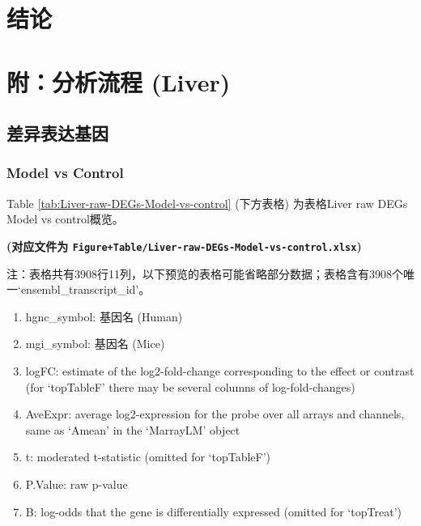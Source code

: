 \documentclass[
]{article}
\providecommand{\tightlist}{%
  \setlength{\itemsep}{0pt}\setlength{\parskip}{0pt}}
\begin{document}
\hypertarget{dis}{%
\section{结论}\label{dis}}

\hypertarget{workflow}{%
\section{附：分析流程 (Liver)}\label{workflow}}

\hypertarget{ux5deeux5f02ux8868ux8fbeux57faux56e0}{%
\subsection{差异表达基因}\label{ux5deeux5f02ux8868ux8fbeux57faux56e0}}

\hypertarget{model-vs-control}{%
\subsubsection{Model vs Control}\label{model-vs-control}}

Table \ref{tab:Liver-raw-DEGs-Model-vs-control} (下方表格) 为表格Liver raw DEGs Model vs control概览。

\textbf{(对应文件为 \texttt{Figure+Table/Liver-raw-DEGs-Model-vs-control.xlsx})}

\begin{center}\begin{tcolorbox}[colback=gray!10, colframe=gray!50, width=0.9\linewidth, arc=1mm, boxrule=0.5pt]注：表格共有3908行11列，以下预览的表格可能省略部分数据；表格含有3908个唯一`ensembl\_transcript\_id'。
\end{tcolorbox}
\end{center}
\begin{center}\begin{tcolorbox}[colback=gray!10, colframe=gray!50, width=0.9\linewidth, arc=1mm, boxrule=0.5pt]\begin{enumerate}\tightlist
\item hgnc\_symbol:  基因名 (Human)
\item mgi\_symbol:  基因名 (Mice)
\item logFC:  estimate of the log2-fold-change corresponding to the effect or contrast (for ‘topTableF’ there may be several columns of log-fold-changes)
\item AveExpr:  average log2-expression for the probe over all arrays and channels, same as ‘Amean’ in the ‘MarrayLM’ object
\item t:  moderated t-statistic (omitted for ‘topTableF’)
\item P.Value:  raw p-value
\item B:  log-odds that the gene is differentially expressed (omitted for ‘topTreat’)
\end{enumerate}\end{tcolorbox}
\end{center}
\end{document}
